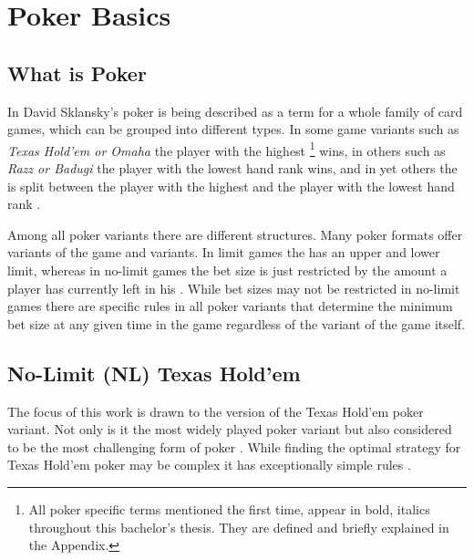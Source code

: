 
\chapter{Poker Basics}
\label{cha:pokerBasics}
\section{What is Poker}
In David Sklansky's \cite{theory_of_poker} poker is being described as a term for a whole family of card games, which can be grouped into different types. In some game variants such as  \textit{Texas Hold'em or Omaha} the player with the highest  \footnote{All poker specific terms mentioned the first time, appear in bold, italics throughout this bachelor's thesis. They are defined and briefly explained in the Appendix.} wins, in others such as \textit{Razz or Badugi} the player with the lowest hand rank wins, and in yet others the  is split between the player with the highest and the player with the lowest hand rank \cite{theory_of_poker}.\par
Among all poker variants there are different  structures. Many poker formats offer  variants of the game and  variants. In limit games the  has an upper and lower limit, whereas in no-limit games the bet size is just restricted by the amount a player has currently left in his  \cite{theory_of_poker}. While bet sizes may not be restricted in no-limit games there are specific rules in all poker variants that determine the minimum bet size at any given time in the game regardless of the variant of the game itself.
\section{No-Limit (NL) Texas Hold'em}
The focus of this work is drawn to the  version of the Texas Hold'em poker variant. Not only is it the most widely played poker variant but also considered to be the most challenging form of poker \cite{strong_poker}. While finding the optimal strategy for Texas Hold'em poker may be complex it has exceptionally simple rules \cite{billings_phd}.
